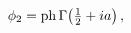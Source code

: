 \[\phi_{2}=\mathop{\mathrm{ph}\/}\nolimits\mathop{\Gamma\/}\nolimits\!\left(%
\tfrac{1}{2}+ia\right),\]